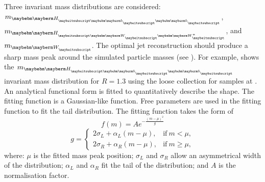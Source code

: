 Three invariant mass distributions are considered:  $m_{\Hbb}$, $m_{\HWW}$, and $m_{\PW}$. The optimal jet reconstruction should produce a sharp mass peak around the simulated particle masses (see ). For example,  shows the $m_{\Hbb}$ invariant mass distribution for $R = 1.3$ using the loose \PFO collection for samples at . An analytical functional form is fitted to quantitatively describe the shape. The fitting function is a Gaussian-like function. Free parameters are used in the fitting function to fit the tail distribution. The fitting function takes the form of
\begin{equation}
f(m)=A e^{- \frac{(m - \mu)^2}{g}}
\end{equation}
\begin{equation}
g=
\begin{cases}
2\sigma_L + \alpha_L(m - \mu), & \text{if}\ m < \mu,\\
2\sigma_R + \alpha_R(m - \mu), & \text{if}\ m \geqslant \mu,
\end{cases}
\end{equation}
where: $\mu$ is the fitted mass peak position; $\sigma_L$ and $\sigma_R$ allow an asymmetrical width of the distribution; $\alpha_L$ and  $\alpha_R$  fit the tail of the distribution; and $A$ is the normalisation factor.


